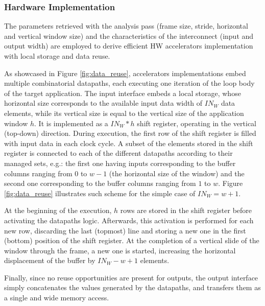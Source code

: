 \documentclass[]{usiinfthesis}
\begin{document}
\subsubsection{Hardware Implementation}

The parameters retrieved with the analysis  pass (frame size, stride, horizontal and vertical window 
size) and the characteristics of the interconnect (input and output width) are employed to derive 
efficient HW accelerators implementation with local storage and data reuse.\par

As showcased in Figure \ref{fig:data_reuse}, accelerators implementations embed multiple 
combinatorial datapaths, each executing one iteration of the loop body of the target application.
The input interface embeds a local storage, whose horizontal size
corresponds to the available input data width of $IN_{W}$ data
elements, while its vertical size is equal to the vertical size
of the application window $h$. It is implemented as a $IN_{W} * h$
shift register, operating in the vertical (top-down) direction. During
execution, the first row of the shift register is filled with input
data in each clock cycle.  A subset of the elements stored in the
shift register is connected to each of the different datapaths
according to their managed sets, e.g.: the first one having inputs
corresponding to the buffer columns ranging from $0$ to $w - 1$ (the
horizontal size of the window) and the second one corresponding to the 
buffer columns ranging from $1$ to $w$.
Figure \ref{fig:data_reuse} illustrates such scheme for the simple case
of $IN_{W} = w+1$.\par

At the beginning of the execution, $h$ rows are stored in the shift register
before activating the datapaths logic. Afterwards, this activation is
performed for each new row, discarding the last (topmost) line and
storing a new one in the first (bottom) position of the shift
register. At the completion of a vertical slide of the window through
the frame, a new one is started, increasing the horizontal displacement 
of the buffer by $IN_{W} - w + 1$ elements.\par

Finally, since no reuse opportunities are present for outputs, 
the output interface simply concatenates the values generated by the datapaths, and
transfers them as a single and wide memory access. 
\end{document}
